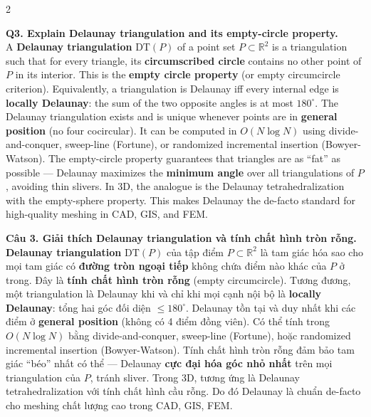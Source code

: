 \begin{paracol}{2}
\switchcolumn*

\textbf{Q3. Explain Delaunay triangulation and its empty-circle property.}\\
A \textbf{Delaunay triangulation} $\mathrm{DT}(P)$ of a point set $P \subset \mathbb{R}^2$ is a triangulation such that for every triangle, its \textbf{circumscribed circle} contains no other point of $P$ in its interior. This is the \textbf{empty circle property} (or empty circumcircle criterion). Equivalently, a triangulation is Delaunay iff every internal edge is \textbf{locally Delaunay}: the sum of the two opposite angles is at most $180^\circ$. The Delaunay triangulation exists and is unique whenever points are in \textbf{general position} (no four cocircular). It can be computed in $O(N \log N)$ using divide-and-conquer, sweep-line (Fortune), or randomized incremental insertion (Bowyer-Watson). The empty-circle property guarantees that triangles are as ``fat'' as possible — Delaunay maximizes the \textbf{minimum angle} over all triangulations of $P$, avoiding thin slivers. In 3D, the analogue is the Delaunay tetrahedralization with the empty-sphere property. This makes Delaunay the de-facto standard for high-quality meshing in CAD, GIS, and FEM.

\switchcolumn

\textbf{Câu 3. Giải thích Delaunay triangulation và tính chất hình tròn rỗng.}\\
\textbf{Delaunay triangulation} $\mathrm{DT}(P)$ của tập điểm $P \subset \mathbb{R}^2$ là tam giác hóa sao cho mọi tam giác có \textbf{đường tròn ngoại tiếp} không chứa điểm nào khác của $P$ ở trong. Đây là \textbf{tính chất hình tròn rỗng} (empty circumcircle). Tương đương, một triangulation là Delaunay khi và chỉ khi mọi cạnh nội bộ là \textbf{locally Delaunay}: tổng hai góc đối diện $\le 180^\circ$. Delaunay tồn tại và duy nhất khi các điểm ở \textbf{general position} (không có 4 điểm đồng viên). Có thể tính trong $O(N \log N)$ bằng divide-and-conquer, sweep-line (Fortune), hoặc randomized incremental insertion (Bowyer-Watson). Tính chất hình tròn rỗng đảm bảo tam giác ``béo'' nhất có thể — Delaunay \textbf{cực đại hóa góc nhỏ nhất} trên mọi triangulation của $P$, tránh sliver. Trong 3D, tương ứng là Delaunay tetrahedralization với tính chất hình cầu rỗng. Do đó Delaunay là chuẩn de-facto cho meshing chất lượng cao trong CAD, GIS, FEM.

\switchcolumn*


\end{paracol}
